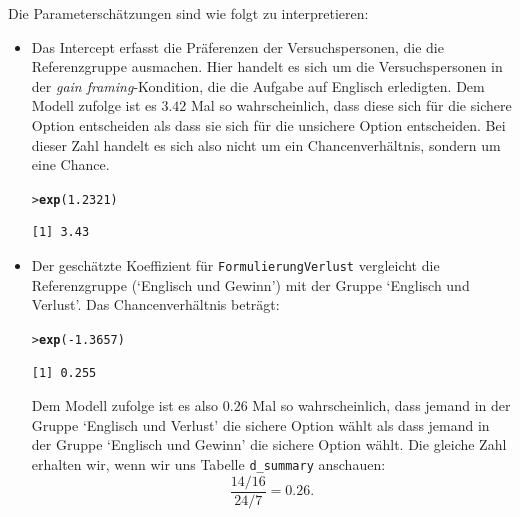 \documentclass[oneside, 10pt]{book}\usepackage[]{graphicx}\usepackage[]{xcolor}
\makeatletter
\newcommand{\hlnum}[1]{\textcolor[rgb]{0.686,0.059,0.569}{#1}}%
\newcommand{\hlopt}[1]{\textcolor[rgb]{0,0,0}{#1}}%
\newcommand{\hlstd}[1]{\textcolor[rgb]{0.345,0.345,0.345}{#1}}%
\newcommand{\hlkwd}[1]{\textcolor[rgb]{0.737,0.353,0.396}{\textbf{#1}}}%
\newenvironment{kframe}{%
 \def\at@end@of@kframe{}%
 \ifinner\ifhmode%
  \def\at@end@of@kframe{\end{minipage}}%
  \begin{minipage}{\columnwidth}%
 \fi\fi%
 \def\FrameCommand##1{\hskip\@totalleftmargin \hskip-\fboxsep
 \colorbox{shadecolor}{##1}\hskip-\fboxsep
     \hskip-\linewidth \hskip-\@totalleftmargin \hskip\columnwidth}%
 \MakeFramed {\advance\hsize-\width
   \@totalleftmargin\z@ \linewidth\hsize
   \@setminipage}}%
 {\par\unskip\endMakeFramed%
 \at@end@of@kframe}
\newenvironment{knitrout}{}{} %
\makeatother
\begin{document}
Die Parameterschätzungen sind wie folgt zu interpretieren:
\begin{itemize}
\item Das Intercept erfasst die Präferenzen der Versuchspersonen,
 die die Referenzgruppe ausmachen. Hier handelt es sich um die Versuchspersonen
 in der \textit{gain framing}-Kondition, die die Aufgabe auf Englisch erledigten.
 Dem Modell zufolge ist es $3.42$ Mal so wahrscheinlich, dass diese
 sich für die sichere Option entscheiden als dass sie sich für die unsichere
 Option entscheiden. Bei dieser Zahl handelt es sich also nicht um
 ein Chancenverhältnis, sondern um eine Chance.
\begin{knitrout}
\color{fgcolor}\begin{kframe}
\begin{alltt}
\hlstd{> }\hlkwd{exp}\hlstd{(}\hlnum{1.2321}\hlstd{)}
\end{alltt}
\begin{verbatim}
[1] 3.43
\end{verbatim}
\end{kframe}
\end{knitrout}

\item Der geschätzte Koeffizient für \texttt{FormulierungVerlust}
vergleicht die Referenzgruppe (`Englisch und Gewinn')
mit der Gruppe `Englisch und Verlust'.
Das Chancenverhältnis beträgt:
\begin{knitrout}
\color{fgcolor}\begin{kframe}
\begin{alltt}
\hlstd{> }\hlkwd{exp}\hlstd{(}\hlopt{-}\hlnum{1.3657}\hlstd{)}
\end{alltt}
\begin{verbatim}
[1] 0.255
\end{verbatim}
\end{kframe}
\end{knitrout}
  Dem Modell zufolge ist es also $0.26$ Mal so wahrscheinlich,
  dass jemand in der Gruppe `Englisch und Verlust' die sichere Option wählt
  als dass jemand in der Gruppe `Englisch und Gewinn' die sichere Option wählt.
  Die gleiche Zahl erhalten wir, wenn wir uns Tabelle \texttt{d\_summary}
  anschauen:
  \[
    \frac{14\Big/16}{24\Big/7} = 0.26.
  \]


\end{itemize}
\end{document}
